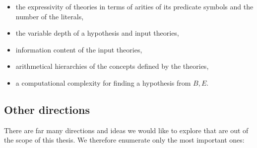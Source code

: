 \begin{itemize}
\item the expressivity of theories in terms of arities of its predicate symbols and the number of the literals,
\item the variable depth of a hypothesis and input theories, 
\item information content of the input theories,
\item arithmetical hierarchies of the concepts defined by the theories,
\item a computational complexity for finding a hypothesis from $B, E$.
\end{itemize}

\subsection{Other directions}
There are far many directions and ideas we would like to explore that are out of the scope of this thesis. We therefore enumerate only the most important ones:
